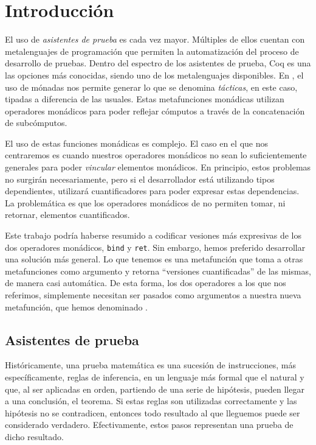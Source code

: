 \chapter{Introducción}\label{ch:intro}

El uso de \emph{asistentes de prueba} es cada vez mayor.
Múltiples de ellos cuentan con metalenguajes de programación que permiten la automatización del proceso de desarrollo de pruebas.
Dentro del espectro de los asistentes de prueba, Coq \cite{CIC} es una las opciones más conocidas, siendo \mtac \cite{DBLP:journals/pacmpl/KaiserZKRD18} uno de los metalenguajes disponibles.
En \Mtac, el uso de mónadas nos permite generar lo que se denomina \emph{tácticas}, en este caso, tipadas a diferencia de las usuales.
Estas metafunciones monádicas utilizan operadores monádicos para poder reflejar cómputos a través de la concatenación de subcómputos.

El uso de estas funciones monádicas es complejo.
El caso en el que nos centraremos es cuando nuestros operadores monádicos no sean lo suficientemente generales para poder \emph{vincular} elementos monádicos.
En principio, estos problemas no surgirán necesariamente, pero si el desarrollador está utilizando tipos dependientes, utilizará cuantificadores para poder expresar estas dependencias. La problemática es que los operadores monádicos de \mtac no permiten tomar, ni retornar, elementos cuantificados.

Este trabajo podría haberse resumido a codificar vesiones más expresivas de los dos operadores monádicos, \lstinline{bind} y \lstinline{ret}.
Sin embargo, hemos preferido desarrollar una solución más general.
Lo que tenemos es una metafunción que toma a otras metafunciones como argumento y retorna ``versiones cuantificadas'' de las mismas, de manera casi automática.
De esta forma, los dos operadores a los que nos referimos, simplemente necesitan ser pasados como argumentos a nuestra nueva metafunción, que hemos denominado \lift.

\section{Asistentes de prueba}

Históricamente, una prueba matemática es una sucesión de instrucciones, más específicamente, reglas de inferencia, en un lenguaje más formal que el natural y que, al ser aplicadas en orden, partiendo de una serie de hipótesis, pueden llegar a una conclusión, el teorema.
Si estas reglas son utilizadas correctamente y las hipótesis no se contradicen, entonces todo resultado al que lleguemos puede ser considerado verdadero. Efectivamente, estos pasos representan una prueba de dicho resultado.

